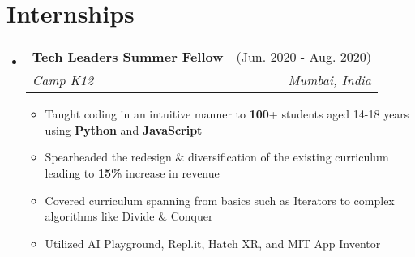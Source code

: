\documentclass[a4paper,11pt]{article}
\makeatletter
\newcommand{\resumeItem}[1]{
  \item\small{
    {#1 \vspace{-2pt}}
  }
}
\newcommand{\resumeSubheading}[4]{
  \vspace{-2pt}\item
    \begin{tabular*}{\textwidth}[t]{l@{\extracolsep{\fill}}r}
      \textbf{#1} & #2 \\
      \textit{\small#3} & \textit{\small #4} \\
    \end{tabular*}\vspace{-7pt}
}
\newcommand{\resumeSubHeadingListStart}{\begin{itemize}[leftmargin=-0pt, label={}]}
\newcommand{\resumeSubHeadingListEnd}{\end{itemize}}
\newcommand{\resumeItemListStart}{\begin{itemize}}
\newcommand{\resumeItemListEnd}{\end{itemize}\vspace{-5pt}}
\makeatother
\begin{document}
  \vspace*{4cm}
  \section{Internships}
    \resumeSubHeadingListStart
      \resumeSubheading
        {Tech Leaders Summer Fellow}{(Jun. 2020 - Aug. 2020)}
        {Camp K12}{Mumbai, India}
        \resumeItemListStart
          \resumeItem{Taught coding in an intuitive manner to \textbf{100}\footnotesize{+} \small students aged 14\hspace{2pt}-\hspace{1pt}18 years using \textbf{Python} and \textbf{JavaScript}}
          \resumeItem{Spearheaded the redesign \& diversification of the existing curriculum leading to \textbf{15\%} increase in revenue}
          \resumeItem{Covered curriculum spanning from basics such as Iterators to complex algorithms like Divide \& Conquer}
          \resumeItem{Utilized AI Playground, Repl.it, Hatch XR, and MIT App Inventor}
        \resumeItemListEnd
    \resumeSubHeadingListEnd
  
\end{document}
